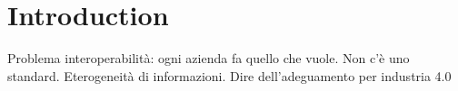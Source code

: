 \chapter{Introduction}
Problema interoperabilità:
ogni azienda fa quello che vuole. Non c'è uno standard. Eterogeneità di informazioni.
Dire dell'adeguamento per industria 4.0